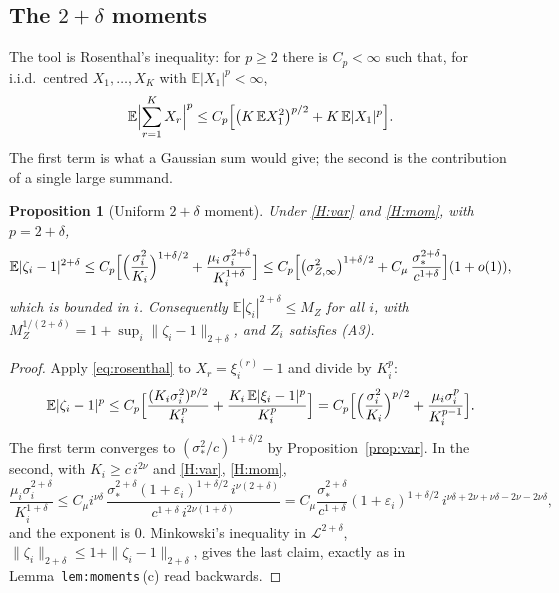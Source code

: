 \documentclass[11pt]{article}
\newtheorem{proposition}{Proposition}
\newcommand{\E}{\mathbb{E}}
\newcommand{\lbl}[1]{\texttt{#1}}
\begin{document}
\subsection{The \texorpdfstring{$2+\delta$}{2+delta} moments}

The tool is Rosenthal's inequality: for $p\ge2$ there is $C_p<\infty$ such that,
for i.i.d.\ centred $X_1,\dots,X_K$ with $\E|X_1|^p<\infty$,
\begin{equation}
  \E\Bigl|\sum_{r=1}^KX_r\Bigr|^p\le C_p\Bigl[\bigl(K\,\E X_1^2\bigr)^{p/2}+K\,\E|X_1|^p\Bigr].
  \label{eq:rosenthal}
\end{equation}
The first term is what a Gaussian sum would give; the second is the
contribution of a single large summand.

\begin{proposition}[Uniform $2+\delta$ moment]\label{prop:mom}
Under \ref{H:var} and \ref{H:mom}, with $p=2+\delta$,
\[
  \E|\zeta_i-1|^{2+\delta}\le C_p\Bigl[\Bigl(\frac{\sigma_i^2}{K_i}\Bigr)^{1+\delta/2}
  +\frac{\mu_i\,\sigma_i^{2+\delta}}{K_i^{1+\delta}}\Bigr]
  \le C_p\Bigl[\bigl(\sigma_{Z,\infty}^2\bigr)^{1+\delta/2}
  +C_\mu\,\frac{\sigma_*^{2+\delta}}{c^{1+\delta}}\Bigr](1+o(1)),
\]
which is bounded in $i$. Consequently $\E|\zeta_i|^{2+\delta}\le M_Z$ for all
$i$, with $M_Z^{1/(2+\delta)}=1+\sup_i\|\zeta_i-1\|_{2+\delta}$, and $Z_i$
satisfies (A3).
\end{proposition}

\begin{proof}
Apply \eqref{eq:rosenthal} to $X_r=\xi_i^{(r)}-1$ and divide by $K_i^{p}$:
\[
  \E|\zeta_i-1|^p\le C_p\Bigl[\frac{(K_i\sigma_i^2)^{p/2}}{K_i^p}
  +\frac{K_i\,\E|\xi_i-1|^p}{K_i^p}\Bigr]
  =C_p\Bigl[\Bigl(\frac{\sigma_i^2}{K_i}\Bigr)^{p/2}+\frac{\mu_i\sigma_i^{p}}{K_i^{p-1}}\Bigr].
\]
The first term converges to $(\sigma_*^2/c)^{1+\delta/2}$ by
Proposition~\ref{prop:var}. In the second, with $K_i\ge c\,i^{2\nu}$ and
\ref{H:var}, \ref{H:mom},
\[
  \frac{\mu_i\sigma_i^{2+\delta}}{K_i^{1+\delta}}
  \le C_\mu i^{\nu\delta}\,
  \frac{\sigma_*^{2+\delta}(1+\varepsilon_i)^{1+\delta/2}\,i^{\nu(2+\delta)}}{c^{1+\delta}\,i^{2\nu(1+\delta)}}
  =C_\mu\frac{\sigma_*^{2+\delta}}{c^{1+\delta}}(1+\varepsilon_i)^{1+\delta/2}\,
   i^{\nu\delta+2\nu+\nu\delta-2\nu-2\nu\delta},
\]
and the exponent is $0$. Minkowski's inequality in $\mathcal L^{2+\delta}$,
$\|\zeta_i\|_{2+\delta}\le1+\|\zeta_i-1\|_{2+\delta}$, gives the last claim,
exactly as in Lemma~\lbl{lem:moments}\,(c) read backwards.
\end{proof}
\end{document}
